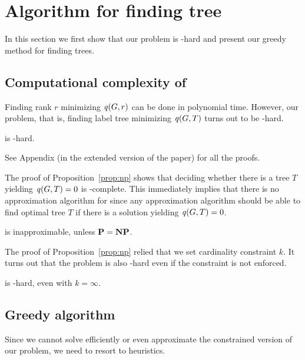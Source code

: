 \section{Algorithm for finding tree}\label{sec:algorithm}

In this section we first show that our problem is \np-hard and
present our greedy method for finding trees.

\subsection{Computational complexity of \prblagy}

Finding rank $r$ minimizing $\score{G, r}$ can be done
in polynomial time. However, our problem, that is, finding label tree
minimizing $\labelscore{G, T}$ turns out to be \np-hard.

\begin{proposition} 
\label{prop:np}
\prblagy is \np-hard.
\end{proposition} 

See Appendix (in the extended version of the paper) for all the proofs.

The proof of Proposition~\ref{prop:np} shows
that deciding whether there is a tree $T$ yielding
$\labelscore{G, T} = 0$ is \np-complete. This immediately implies that
there is no approximation algorithm for \prblagy since any approximation
algorithm should be able to find optimal tree $T$ if there is a solution
yielding $\labelscore{G, T} = 0$.


\begin{corollary}
\prblagy is inapproximable, unless $\textbf{P}=\textbf{NP}$.
\end{corollary}

The proof of
Proposition~\ref{prop:np} relied that we set cardinality constraint $k$.
It turns out that the problem is also \np-hard even if the constraint
is not enforced.

\begin{proposition} 
\label{prop:np2}
\prblagy is \np-hard, even with $k = \infty$.
\end{proposition} 


\subsection{Greedy algorithm}

Since we cannot solve \prblagy efficiently  or even approximate the constrained version of our
problem, we need to resort to heuristics.

